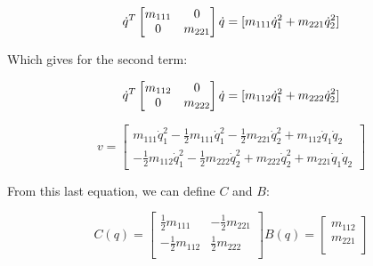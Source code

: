 \documentclass{exam}
\begin{document}
\begin{questions}
\begin{parts}
\begin{equation}
  \dot q^T \begin{bmatrix}
     m_{111} & 0       \\
     0       & m_{221} \\
           \end{bmatrix} \dot q \\ 
  = [m_{111} \dot q_1^2 + m_{221} \dot q_2^2]
\end{equation}

Which gives for the second term:

\begin{equation}
  \dot q^T \begin{bmatrix}
     m_{112} & 0       \\
     0       & m_{222} \\
           \end{bmatrix} \dot q \\ 
  = [m_{112} \dot q_1^2 + m_{222} \dot q_2^2]
\end{equation}

\begin{equation}
  v = \begin{bmatrix}
    m_{111} \dot q_1^2 -\frac{1}{2}m_{111} \dot q_1^2 
    -\frac{1}{2}m_{221} \dot q_2^2 + m_{112} \dot q_1 \dot q_2 \\
    -\frac{1}{2}m_{112} \dot q_1^2 -\frac{1}{2}m_{222} \dot q_2^2
    +m_{222} \dot q_2^2 + m_{221} \dot q_1 \dot q_2
      \end{bmatrix}
\end{equation}

From this last equation, we can define ${C}$ and ${B}$:

\begin{subequations}
  \begin{equation}
    C(q) = \begin{bmatrix}
	     \frac{1}{2}m_{111}  & -\frac{1}{2}m_{221} \\
	     -\frac{1}{2}m_{112} & \frac{1}{2}m_{222}  \\
	   \end{bmatrix}
  \end{equation}
  \begin{equation}
    B(q) = \begin{bmatrix}
	     m_{112} \\
	     m_{221} \\
	   \end{bmatrix}
  \end{equation}
\end{subequations}


\end{parts}
\end{questions}
\end{document}
